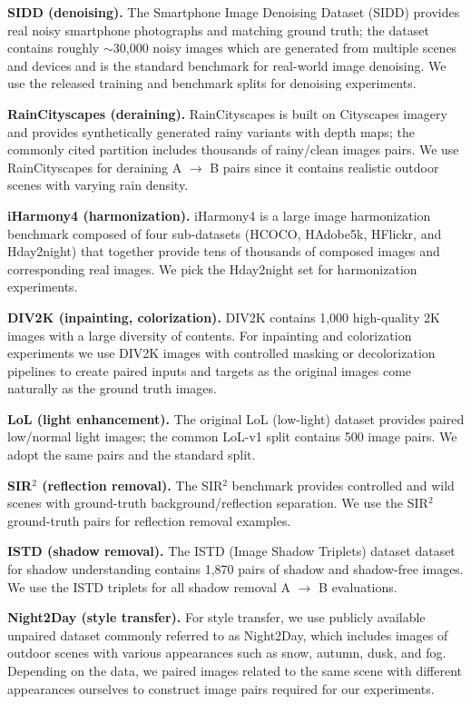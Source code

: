 \noindent \textbf{SIDD (denoising).} The Smartphone Image Denoising Dataset (SIDD) provides real noisy smartphone photographs and matching ground truth; the dataset contains roughly $\sim$30,000 noisy images which are generated from multiple scenes and devices and is the standard benchmark for real-world image denoising. We use the released training and benchmark splits for denoising experiments.

\noindent \textbf{RainCityscapes (deraining).} RainCityscapes is built on Cityscapes imagery and provides synthetically generated rainy variants with depth maps; the commonly cited partition includes thousands of rainy/clean images pairs. We use RainCityscapes for deraining A $\rightarrow$ B pairs since it contains realistic outdoor scenes with varying rain density.

\noindent \textbf{iHarmony4 (harmonization).} iHarmony4 is a large image harmonization benchmark composed of four sub-datasets (HCOCO, HAdobe5k, HFlickr, and Hday2night) that together provide tens of thousands of composed images and corresponding real images. We pick the Hday2night set for harmonization experiments.

\noindent \textbf{DIV2K (inpainting, colorization).} DIV2K contains 1,000 high-quality 2K images with a large diversity of contents. For inpainting and colorization experiments we use DIV2K images with controlled masking or decolorization pipelines to create paired inputs and targets as the original images come naturally as the ground truth images.

\noindent \textbf{LoL (light enhancement).} The original LoL (low-light) dataset provides paired low/normal light images; the common LoL-v1 split contains 500 image pairs. We adopt the same pairs and the standard split.

\noindent \textbf{SIR$^2$ (reflection removal).} The SIR$^2$ benchmark provides controlled and wild scenes with ground-truth background/reflection separation. We use the SIR$^2$ ground-truth pairs for reflection removal examples.

\noindent \textbf{ISTD (shadow removal).} The ISTD (Image Shadow Triplets) dataset dataset for shadow understanding contains 1,870 pairs of shadow and shadow-free images. We use the ISTD triplets for all shadow removal A $\rightarrow$ B evaluations.

\noindent \textbf{Night2Day (style transfer).} For style transfer, we use publicly available unpaired dataset commonly referred to as Night2Day, which includes images of outdoor scenes with various appearances such as snow, autumn, dusk, and fog. Depending on the data, we paired images related to the same scene with different appearances ourselves to construct image pairs required for our experiments.

